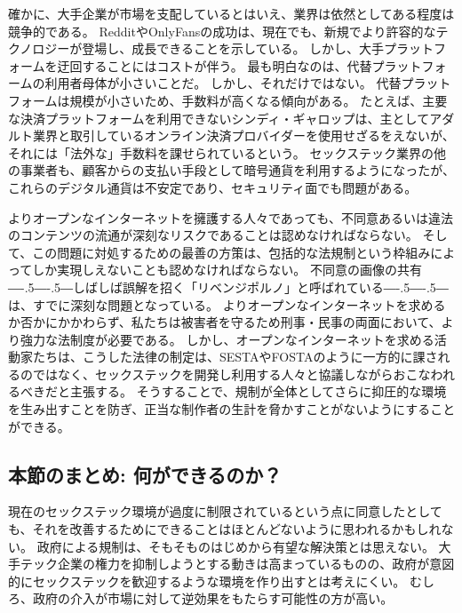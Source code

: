 \documentclass[paper=a4,book,openany]{jlreq}
\def\DDASH{―\kern-.5\zw―\kern-.5\zw―} %
\begin{document}
確かに、大手企業が市場を支配しているとはいえ、業界は依然としてある程度は競争的である。
RedditやOnlyFansの成功は、現在でも、新規でより許容的なテクノロジーが登場し、成長できることを示している。
しかし、大手プラットフォームを迂回することにはコストが伴う。
最も明白なのは、代替プラットフォームの利用者母体が小さいことだ。
しかし、それだけではない。
代替プラットフォームは規模が小さいため、手数料が高くなる傾向がある。
たとえば、主要な決済プラットフォームを利用できないシンディ・ギャロップは、主としてアダルト業界と取引しているオンライン決済プロバイダーを使用せざるをえないが、それには「法外な」手数料を課せられているという。
セックステック業界の他の事業者も、顧客からの支払い手段として暗号通貨を利用するようになったが、これらのデジタル通貨は不安定であり、セキュリティ面でも問題がある。

よりオープンなインターネットを擁護する人々であっても、不同意あるいは違法のコンテンツの流通が深刻なリスクであることは認めなければならない。
そして、この問題に対処するための最善の方策は、包括的な法規制という枠組みによってしか実現しえないことも認めなければならない。
不同意の画像の共有{\DDASH}しばしば誤解を招く「リベンジポルノ」と呼ばれている{\DDASH}は、すでに深刻な問題となっている。
よりオープンなインターネットを求めるか否かにかかわらず、私たちは被害者を守るため刑事・民事の両面において、より強力な法制度が必要である\citep{kibbe20:_faceb_has_banned_ads_kink}。
しかし、オープンなインターネットを求める活動家たちは、こうした法律の制定は、SESTAやFOSTAのように一方的に課されるのではなく、セックステックを開発し利用する人々と協議しながらおこなわれるべきだと主張する。
そうすることで、規制が全体としてさらに抑圧的な環境を生み出すことを防ぎ、正当な制作者の生計を脅かすことがないようにすることができる。

\subsection{本節のまとめ: 何ができるのか？}

現在のセックステック環境が過度に制限されているという点に同意したとしても、それを改善するためにできることはほとんどないように思われるかもしれない。
政府による規制は、そもそものはじめから有望な解決策とは思えない。
大手テック企業の権力を抑制しようとする動きは高まっているものの、政府が意図的にセックステックを歓迎するような環境を作り出すとは考えにくい。
むしろ、政府の介入が市場に対して逆効果をもたらす可能性の方が高い。
\end{document}
